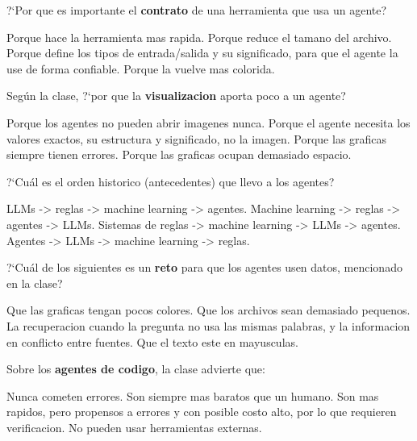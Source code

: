 \documentclass[12pt,addpoints]{exam}
\begin{document}
\begin{questions}
\question[1] ?`Por que es importante el \textbf{contrato} de una herramienta que
usa un agente?
\begin{choices}
  \choice Porque hace la herramienta mas rapida.
  \choice Porque reduce el tamano del archivo.
  \CorrectChoice Porque define los tipos de entrada/salida y su significado, para
    que el agente la use de forma confiable.
  \choice Porque la vuelve mas colorida.
\end{choices}

\question[1] Seg\'un la clase, ?`por que la \textbf{visualizacion} aporta poco a
un agente?
\begin{choices}
  \choice Porque los agentes no pueden abrir imagenes nunca.
  \CorrectChoice Porque el agente necesita los valores exactos, su estructura y
    significado, no la imagen.
  \choice Porque las graficas siempre tienen errores.
  \choice Porque las graficas ocupan demasiado espacio.
\end{choices}

\question[1] ?`Cu\'al es el orden historico (antecedentes) que llevo a los
agentes?
\begin{choices}
  \choice LLMs -> reglas -> machine learning -> agentes.
  \choice Machine learning -> reglas -> agentes -> LLMs.
  \CorrectChoice Sistemas de reglas -> machine learning -> LLMs -> agentes.
  \choice Agentes -> LLMs -> machine learning -> reglas.
\end{choices}

\question[1] ?`Cu\'al de los siguientes es un \textbf{reto} para que los agentes
usen datos, mencionado en la clase?
\begin{choices}
  \choice Que las graficas tengan pocos colores.
  \choice Que los archivos sean demasiado pequenos.
  \CorrectChoice La recuperacion cuando la pregunta no usa las mismas palabras, y
    la informacion en conflicto entre fuentes.
  \choice Que el texto este en mayusculas.
\end{choices}

\question[1] Sobre los \textbf{agentes de codigo}, la clase advierte que:
\begin{choices}
  \choice Nunca cometen errores.
  \choice Son siempre mas baratos que un humano.
  \CorrectChoice Son mas rapidos, pero propensos a errores y con posible costo
    alto, por lo que requieren verificacion.
  \choice No pueden usar herramientas externas.
\end{choices}

\end{questions}
\end{document}
